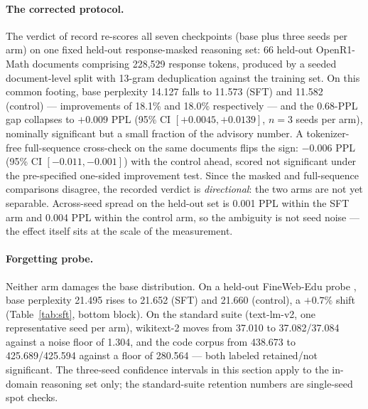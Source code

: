 \paragraph{The corrected protocol.}
The verdict of record re-scores all seven checkpoints (base plus three seeds
per arm) on one fixed held-out response-masked reasoning set: 66 held-out
OpenR1-Math documents comprising 228{,}529 response tokens, produced by a
seeded document-level split with 13-gram deduplication against the training
set. On this common footing, base perplexity 14.127 falls to 11.573 (SFT) and
11.582 (control) --- improvements of 18.1\% and 18.0\% respectively --- and
the 0.68-PPL gap collapses to $+0.009$ PPL (95\% CI $[+0.0045, +0.0139]$,
$n{=}3$ seeds per arm), nominally significant but a small fraction of the
advisory number. A tokenizer-free full-sequence cross-check
on the same documents flips the sign: $-0.006$ PPL (95\% CI $[-0.011,
-0.001]$) with the control ahead, scored not significant under the
pre-specified one-sided improvement test. Since the masked and full-sequence
comparisons disagree, the recorded verdict is \emph{directional}: the two arms
are not yet separable. Across-seed spread on the held-out set is 0.001 PPL
within the SFT arm and 0.004 PPL within the control arm, so the ambiguity is
not seed noise --- the effect itself sits at the scale of the measurement.

\paragraph{Forgetting probe.}
Neither arm damages the base distribution. On a held-out FineWeb-Edu probe
\citep{penedo2024fineweb}, base perplexity 21.495 rises to 21.652 (SFT) and
21.660 (control), a $+0.7\%$ shift (Table~\ref{tab:sft}, bottom block). On the
standard suite (text-lm-v2, one representative seed per arm), wikitext-2 moves
from 37.010 to 37.082/37.084 against a noise floor of 1.304, and the code
corpus from 438.673 to 425.689/425.594 against a floor of 280.564 --- both
labeled retained/not significant. The three-seed confidence intervals in this
section apply to the in-domain reasoning set only; the standard-suite
retention numbers are single-seed spot checks.

